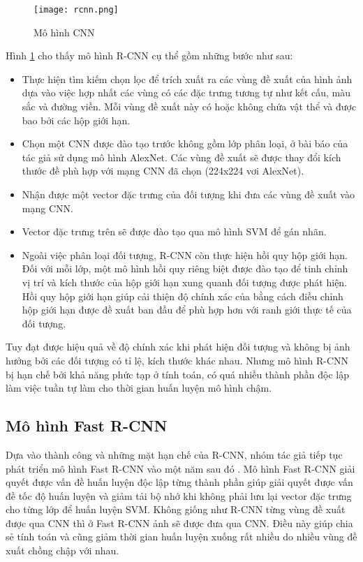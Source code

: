 \documentclass[../the.tex]{subfiles}
\begin{document}
\begin{figure}[H]
	\centering
	\texttt{[image: rcnn.png]}
	\caption{Mô hình CNN \cite{girshick2014rich}}
	\label{fig:rcnn}
\end{figure}

{\fontsize{13}{12} \selectfont

Hình \ref{fig:rcnn} cho thấy mô hình R-CNN cụ thể gồm những bước như sau:

\begin{itemize}
	\item Thực hiện tìm kiếm chọn lọc để trích xuất ra các vùng đề xuất của hình ảnh dựa vào việc hợp nhất các vùng có các đặc trưng tương tự như kết cấu, màu sắc và đường viền. Mỗi vùng đề xuất này có hoặc không chứa vật thể và được bao bởi các hộp giới hạn.
	\item Chọn một CNN được đào tạo trước không gồm lớp phân loại, ở bài báo của tác giả sử dụng mô hình AlexNet. Các vùng đề xuất sẽ được thay đổi kích thước đề phù hợp với mạng CNN đã chọn (224x224 vơi AlexNet).
	\item Nhận được một vector đặc trưng của đối tượng khi đưa các vùng đề xuất vào mạng CNN.
	\item Vector đặc trưng trên sẽ được đào tạo qua mô hình SVM để gán nhãn.
	\item Ngoài việc phân loại đối tượng, R-CNN còn thực hiện hồi quy hộp giới hạn. Đối với mỗi lớp, một mô hình hồi quy riêng biệt được đào tạo để tinh chỉnh vị trí và kích thước của hộp giới hạn xung quanh đối tượng được phát hiện. Hồi quy hộp giới hạn giúp cải thiện độ chính xác của bằng cách điều chỉnh hộp giới hạn được đề xuất ban đầu để phù hợp hơn với ranh giới thực tế của đối tượng.
\end{itemize}

}

{\fontsize{13}{12} \selectfont

Tuy đạt được hiệu quả về độ chính xác khi phát hiện đối tượng và không bị ảnh hưởng bởi các đối tượng có tỉ lệ, kích thước khác nhau.
Nhưng mô hình R-CNN bị hạn chế bởi khả năng phức tạp ở tính toán, có quá nhiều thành phần độc lập làm việc tuần tự làm cho thời gian huấn luyện mô hình chậm.

}

\subsection{Mô hình Fast R-CNN}

{\fontsize{13}{12} \selectfont

	Dựa vào thành công và những mặt hạn chế của R-CNN, nhóm tác giả tiếp tục phát triển mô hình Fast R-CNN vào một năm sau đó \cite{girshick2015fast}.
	Mô hình Fast R-CNN giải quyết được vấn đề huấn luyện độc lập từng thành phần giúp giải quyết được vấn đề tốc độ huấn luyện và giảm tải bộ nhớ khi không phải lưu lại vector đặc trưng cho từng lớp để huấn luyện SVM.
	Không giống như R-CNN từng vùng đề xuất được qua CNN thì ở Fast R-CNN ảnh sẽ được đưa qua CNN. Điều này giúp chia sẻ tính toán và cũng giảm thời gian huấn luyện xuống rất nhiều do nhiều vùng đề xuất chồng chập với nhau.

}
\end{document}
